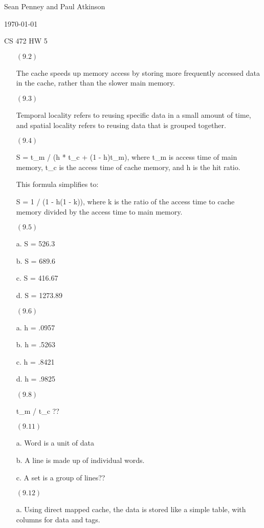 \documentclass[letterpaper,10pt,titlepage]{article}
\def\name{Sean Penney and Paul Atkinson}
\begin{document}
\hfill \name

\hfill \today

\hfill CS 472 HW 5

\begin{enumerate}
\item[$(9.2)$] 

  The cache speeds up memory access by storing more frequently accessed data in the cache, rather than the slower main memory.

\item[$(9.3)$]

  Temporal locality refers to reusing specific data in a small amount of time, and spatial locality refers to reusing data that is grouped together.    

\item[$(9.4)$]

  S = t_{m} / (h * t_{c} + (1 - h)t_{m}), where t_{m} is access time of main memory, t_{c} is the access time of cache memory, and h is the hit ratio.
 
  This formula simplifies to:
 
  S = 1 / (1 - h(1 - k)), where k is the ratio of the access time to cache memory divided by the access time to main memory.
  
\item[$(9.5)$]
  
  a.  S = 526.3%
 
  b.  S = 689.6%
 
  c.  S = 416.67%
 
  d.  S = 1273.89%
  
\item[$(9.6)$]

  a.  h = .0957
 
  b.  h = .5263
 
  c.  h = .8421
 
  d.  h = .9825

\item[$(9.8)$]
  
  t_{m} / t_{c} ??
  
\item[$(9.11)$]   
  
  a.  Word is a unit of data
  
  b.  A line is made up of individual words.
  
  c.  A set is a group of lines??
  
\item[$(9.12)$]
  
  a.  Using direct mapped cache, the data is stored like a simple table, with columns for data and tags.
 

\end{enumerate}
\end{document}
